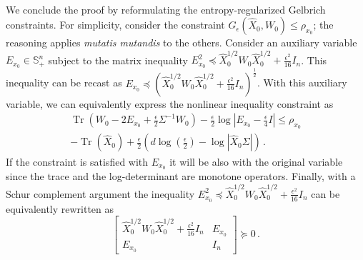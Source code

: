 \documentclass[letterpaper, 10 pt, conference]{ieeeconf}  %
\makeatletter
\renewenvironment{proof}[1][\proofname]{\par
  \pushQED{\qed}%
  \normalfont \topsep\z@
  \trivlist
  \item[\hskip2em
        \itshape
    #1\@addpunct{:}]\ignorespaces
}{%
  \popQED\endtrivlist\@endpefalse
}
\theoremstyle{ieeeconf}
\DeclareMathOperator{\Tr}{Tr}
\newcommand{\Symm}{\mathbb{S}}
\makeatother
\begin{document}
\begin{proof}
\begin{align*}
\end{align*}
We conclude the proof by reformulating the entropy-regularized Gelbrich constraints. For simplicity, consider the constraint $G_\epsilon(\hat{X}_0, W_0) \leq \rho_{x_0}$; the reasoning applies \textit{mutatis mutandis} to the others. Consider an auxiliary variable $E_{x_0}\in\Symm^n_{+}$ subject to the matrix inequality $E_{x_0}^2 \preceq \hat{X}_0^{1/2} W_0 \hat{X}_0^{1/2} +\frac{\epsilon^2}{16}I_n$. This inequality can be recast as $E_{x_0} \preceq (\hat{X}_0^{1/2} W_0 \hat{X}_0^{1/2} +\frac{\epsilon^2}{16}I_n)^\frac{1}{2}$. With this auxiliary variable, we can equivalently express the nonlinear inequality constraint as
\begin{equation*}
\begin{multlined}
   \Tr\left(W_0 - 2E_{x_0}+\frac{\epsilon}{2}\Sigma^{-1}W_0\right) - \frac{\epsilon}{2}\log\left|E_{x_0} - \frac{\epsilon}{4}I\right| \leq \rho_{x_0}
   \\
   - \Tr(\hat{X}_0) + \frac{\epsilon}{2}\left(d\log\left(\frac{\epsilon}{2}\right)-\log|\hat{X}_0\Sigma|\right)\,.
\end{multlined}
\end{equation*}
If the constraint is satisfied with $E_{x_0}$ it will be also with the original variable since the trace and the log-determinant are monotone operators. Finally, with a Schur complement argument the inequality $E_{x_0}^2 \preceq \hat{X}_0^{1/2} W_0 \hat{X}_0^{1/2} +\frac{\epsilon^2}{16}I_n$ can be equivalently rewritten as
\begin{equation*}
    \begin{bmatrix}
\hat{X}_0^{1/2} W_0 \hat{X}_0^{1/2} +\frac{\epsilon^2}{16}I_n & E_{x_0} \\
E_{x_0} & I_n
\end{bmatrix} \succeq 0\,.
\end{equation*}
\end{proof}
% 
\end{document}
